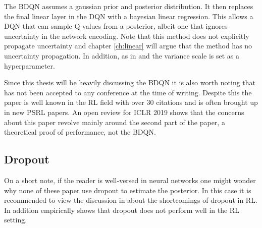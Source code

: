 The BDQN assumes a gaussian prior and posterior distribution. It then replaces the final linear layer in the DQN with a bayesian linear regression. This allows a DQN that can sample Q-values from a posterior, albeit one that ignores uncertainty in the network encoding. Note that this method does not explicitly propagate uncertainty and chapter \ref{ch:linear} will argue that the method has no uncertainty propagation. In addition, as in \cite{donoghue_2017} and \cite{osband_2018} the variance scale is set as a hyperparameter.

Since this thesis will be heavily discussing the BDQN it is also worth noting that \cite{azziz_2018} has not been accepted to any conference at the time of writing. Despite this the paper is well known in the RL field with over 30 citations and is often brought up in new PSRL papers. An open review for ICLR 2019 shows that the concerns about this paper revolve mainly around the second part of the paper, a theoretical proof of performance, not the BDQN\citep{openreview_bdqn}.

\subsection{Dropout}

On a short note, if the reader is well-versed in neural networks one might wonder why none of these paper use dropout to estimate the posterior. In this case it is recommended to view the discussion in \cite{osband_2018} about the shortcomings of dropout in RL. In addition \cite{azziz_2018} empirically shows that dropout does not perform well in the RL setting.

\cleardoublepage